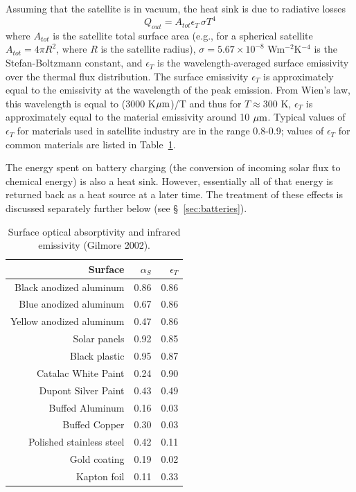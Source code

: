 \documentclass[]{aastex62}
\def\eq#1{\begin{equation} #1 \end{equation}}
\def\mic              {\hbox{$\mu\mathrm{m}$}}
\begin{document}
Assuming that the satellite is in vacuum, the heat sink is due to radiative losses
\eq{
\label{eq:Qout}
                      Q_{out} = A_{tot} \epsilon_T \, \sigma T^4  
}
where $A_{tot}$ is the satellite total surface area (e.g., for a spherical satellite $A_{tot} = 4\pi R^2$,
where $R$ is the satellite radius), $\sigma=5.67\times10^{-8}$ Wm$^{-2}$K$^{-4}$ is the Stefan-Boltzmann 
constant,  and $\epsilon_T$ is the wavelength-averaged surface emissivity over the thermal flux distribution. 
The surface emissivity $\epsilon_T$ is approximately equal to the emissivity at the wavelength of the peak emission. From Wien's 
law, this wavelength is equal to (3000 K$\mic$)/T and thus for $T \approx 300$ K, $\epsilon_T$ is approximately 
equal to the material emissivity around 10 $\mic$. Typical values of $\epsilon_T$  for materials used in 
satellite industry are in the range 0.8-0.9; values of $\epsilon_T$ for common materials are listed in 
Table~\ref{tab:inputsAbsEmiss}. 

The energy spent on battery charging (the conversion of incoming solar flux to chemical energy) is 
also a heat sink. However, essentially all of that energy is returned back as a heat source at a later time. 
The treatment of these effects is discussed separately further below (see \S~\ref{sec:batteries}). 


\begin{table}[t]
	\centering
	\caption{Surface optical absorptivity and infrared emissivity (Gilmore 2002). }
	\label{tab:inputsAbsEmiss}
	\begin{tabular}{r|r|r} %
		\hline
  	                  Surface       &    $\alpha_S$  &   $\epsilon_T$    \\
		\hline
  Black anodized aluminum  &       0.86      &         0.86     \\ 
    Blue anodized aluminum  &       0.67      &         0.86     \\ 
 Yellow anodized aluminum  &       0.47     &         0.86     \\ 
   Solar panels                      &        0.92     &         0.85     \\
   Black plastic                     &       0.95       &         0.87     \\ 
   Catalac White Paint          &        0.24      &         0.90      \\ 
   Dupont Silver Paint        &          0.43      &         0.49      \\
   Buffed Aluminum           &          0.16      &         0.03      \\  
    Buffed Copper               &          0.30      &         0.03      \\  
  Polished stainless steel   &         0.42        &        0.11     \\ 
      Gold coating                &        0.19        &       0.02       \\
     Kapton foil                    &       0.11         &        0.33      \\
		\hline
	\end{tabular} 
\end{table}
\end{document}
